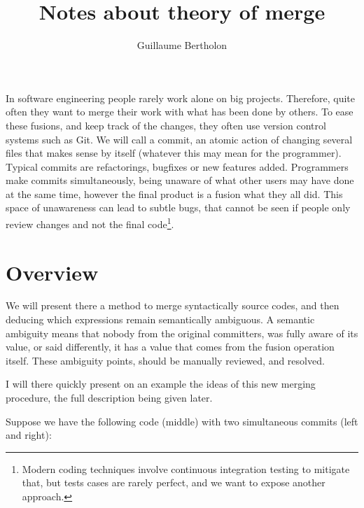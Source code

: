 \documentclass[a4paper,10pt]{article}
\title{Notes about theory of merge}
\author{Guillaume Bertholon}
\begin{document}
\maketitle

In software engineering people rarely work alone on big projects. Therefore, quite often they want to merge their work with what has been done by others. To ease these fusions, and keep track of the changes, they often use version control systems such as Git. We will call a commit, an atomic action of changing several files that makes sense by itself (whatever this may mean for the programmer). Typical commits are refactorings, bugfixes or new features added. Programmers make commits simultaneously, being unaware of what other users may have done at the same time, however the final product is a fusion what they all did. This space of unawareness can lead to subtle bugs, that cannot be seen if people only review changes and not the final code\footnote{Modern coding techniques involve continuous integration testing to mitigate that, but tests cases are rarely perfect, and we want to expose another approach.}.

\section{Overview}

We will present there a method to merge syntactically source codes, and then deducing which expressions remain semantically ambiguous. A semantic ambiguity means that nobody from the original committers, was fully aware of its value, or said differently, it has a value that comes from the fusion operation itself. These ambiguity points, should be manually reviewed, and resolved.

I will there quickly present on an example the ideas of this new merging procedure, the full description being given later.

Suppose we have the following code (middle) with two simultaneous commits (left and right):
\end{document}
